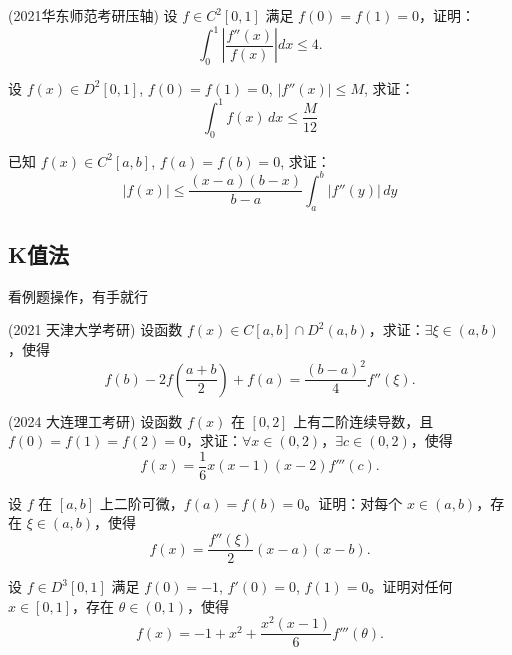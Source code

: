 \documentclass[lang=cn,10pt,thmcnt=section]{elegantbook}
\begin{document}
\begin{example}
	(2021华东师范考研压轴) 设 \( f \in C^2[0,1] \) 满足 \( f(0) = f(1) = 0 \)，证明：
\[ \int_0^1 \left| \frac{f''(x)}{f(x)} \right| dx \leq 4. \]
\end{example}
\begin{example}
	设 \( f(x) \in D^2[0, 1] \), \( f(0) = f(1) = 0 \), \( |f''(x)| \leq M \), 求证：
    \[ \int_{0}^{1} f(x) \, dx \leq \frac{M}{12} \]
    
\end{example}
\begin{example}
	已知 \( f(x) \in C^2[a, b] \), \( f(a) = f(b) = 0 \), 求证：
    \[ |f(x)| \leq \frac{(x - a)(b - x)}{b - a} \int_{a}^{b} |f''(y)| \, dy \]
\end{example}
\subsection{K值法}
看例题操作，有手就行
\begin{example}
	(2021 天津大学考研) 设函数 \( f(x) \in C[a,b] \cap D^2(a,b) \)，求证：\(\exists \xi \in (a,b)\)，使得
\[ f(b) - 2f\left(\frac{a+b}{2}\right) + f(a) = \frac{(b-a)^2}{4}f''(\xi). \]
\end{example}
\begin{example}
	(2024 大连理工考研) 设函数 \( f(x) \) 在 \([0,2]\) 上有二阶连续导数，且 \( f(0) = f(1) = f(2) = 0 \)，求证：\(\forall x \in (0,2)\)，\(\exists c \in (0,2)\)，使得
\[ f(x) = \frac{1}{6}x(x-1)(x-2)f'''(c). \]
\end{example}
\begin{example}
	设 $f$ 在 $[a,b]$ 上二阶可微，$f(a) = f(b) = 0$。证明：对每个 $x \in (a,b)$，存在 $\xi \in (a,b)$，使得
    \[ f(x) = \frac{f''(\xi)}{2}(x-a)(x-b). \]
\end{example}
\begin{example}
	设 $f \in D^3[0,1]$ 满足 $f(0) = -1$, $f'(0) = 0$, $f(1) = 0$。证明对任何 $x \in [0,1]$，存在 $\theta \in (0,1)$，使得
    \[ f(x) = -1 + x^2 + \frac{x^2(x-1)}{6}f'''(\theta). \]
\end{example}
\end{document}
